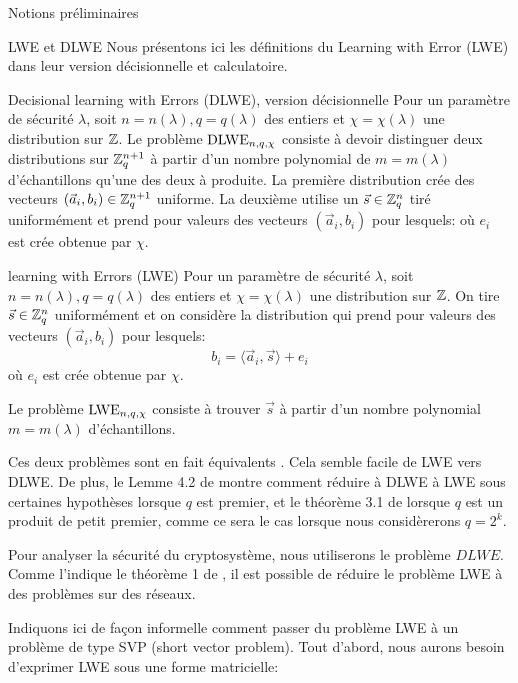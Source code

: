 \begin{section}{Notions préliminaires}
	\begin{subsection}{LWE et DLWE}
	Nous présentons ici les définitions du Learning with Error
	(LWE) dans leur version décisionnelle et calculatoire.
	
	\begin{definition}{Decisional learning with Errors (DLWE), version décisionnelle}
	Pour un paramètre de sécurité $\lambda$, soit $n = n(\lambda),q = q(\lambda)$ 
	des entiers et $\chi = \chi(\lambda)$ une
	distribution sur $\mathbb{Z}$.
	Le problème $\text{DLWE}_{n,q,\chi}$ consiste à devoir distinguer 
	deux distributions sur $\mathbb{Z}_q^{n+1}$ à partir d'un nombre polynomial
	de $m = m(\lambda)$ d'échantillons qu'une des deux à produite.
	La première distribution crée des vecteurs $(\vec{a}_i,b_i) \in
	\mathbb{Z}_q^{n+1}$ uniforme.
	La deuxième utilise un $\vec{s} \in \mathbb{Z}_q^n$ tiré uniformément et 
	prend pour valeurs des vecteurs $(\vec{a}_i, b_i)$ pour lesquels:
	où $e_i$ est crée obtenue par $\chi$.
	\end{definition}

	\begin{definition}{learning with Errors (LWE)}
	Pour un paramètre de sécurité $\lambda$, soit $n = n(\lambda),q = q(\lambda)$ 
	des entiers et $\chi = \chi(\lambda)$ une
	distribution sur $\mathbb{Z}$. On tire $\vec{s} \in \mathbb{Z}_q^n$ uniformément 
	et on considère la distribution qui  
	prend pour valeurs des vecteurs $(\vec{a}_i, b_i)$ pour lesquels:
		\[ b_i = \langle \vec{a}_i, \vec{s} \rangle + e_i \]
	où $e_i$ est crée obtenue par $\chi$.

	Le problème $\text{LWE}_{n,q,\chi}$ consiste à trouver $\vec{s}$ à partir d'un nombre
	polynomial $m = m(\lambda)$ d'échantillons.
	\end{definition}

	Ces deux problèmes sont en fait \og équivalents \fg. Cela semble facile
		de LWE vers DLWE. De plus,
	le Lemme 4.2 de \cite{STOC:Regev05} montre comment réduire à
	DLWE à LWE sous certaines hypothèses lorsque $q$ est premier, et 
	le théorème 3.1 de \cite{EPRINT:MicPei11} lorsque $q$ est un produit 
	de petit premier, comme ce sera le cas lorsque nous considèrerons 
	$q = 2^k$.

	
	Pour analyser la sécurité du cryptosystème, nous utiliserons le
	problème $DLWE$. 
	Comme l'indique le théorème 1 de \cite{C:GenSahWat13}, il est
	possible de réduire le problème LWE à des problèmes sur des réseaux.


	Indiquons ici de façon informelle comment passer du problème LWE à un 
	problème de type SVP (short vector problem).
	Tout d'abord, nous aurons besoin d'exprimer LWE sous une forme
	matricielle:


\end{subsection}
\end{section}
